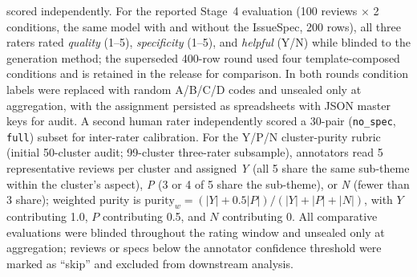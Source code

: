 \documentclass[sigconf, anonymous]{acmart}
\begin{document}
  scored independently. For the reported Stage~4 evaluation (100 reviews $\times$ 2 conditions,
  the same model with and without the IssueSpec, 200 rows), all three raters rated
  \emph{quality} (1--5), \emph{specificity} (1--5), and \emph{helpful} (Y/N) while blinded to
  the generation method; the superseded 400-row round used four template-composed conditions and
  is retained in the release for comparison. In both rounds condition labels were replaced with random A/B/C/D codes and unsealed
  only at aggregation, with the assignment persisted as spreadsheets with JSON master keys for
  audit. A second human rater independently scored a 30-pair (\texttt{no\_spec}, \texttt{full})
  subset for inter-rater calibration. For the Y/P/N cluster-purity rubric (initial 50-cluster
  audit; 99-cluster three-rater subsample), annotators read 5 representative reviews per cluster
   and assigned \emph{Y} (all 5 share the same sub-theme within the cluster's aspect), \emph{P}
  (3 or 4 of 5 share the sub-theme), or \emph{N} (fewer than 3 share); weighted purity is
  $\mathrm{purity}_w = (|Y| + 0.5|P|)/(|Y|+|P|+|N|)$, with $Y$ contributing 1.0, $P$
  contributing 0.5, and $N$ contributing 0. All comparative evaluations were blinded throughout
  the rating window and unsealed only at aggregation; reviews or specs below the annotator
  confidence threshold were marked as ``skip'' and excluded from downstream analysis.
\end{document}
